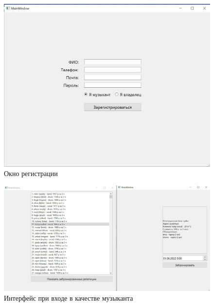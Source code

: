 \newpage

\begin{figure}[h!]
	\begin{center}
		\includegraphics[scale=0.4]{jpg/Reg.jpg}
	\end{center}
	\captionsetup{justification=centering}
	\caption{Окно регистрации}
\end{figure}

\begin{figure}[h!]
	\begin{center}
		\includegraphics[scale=0.35]{jpg/Musician.jpg}
	\end{center}
	\captionsetup{justification=centering}
	\caption{Интерфейс при входе в качестве музыканта}
\end{figure}

\newpage

